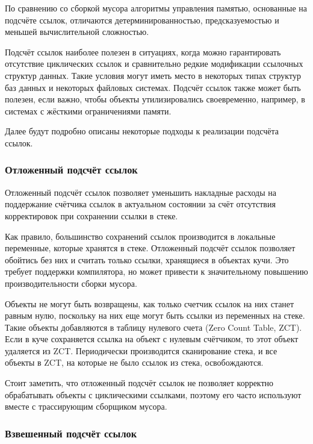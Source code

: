 По сравнению со сборкой мусора алгоритмы управления памятью, основанные на подсчёте ссылок, отличаются детерминированностью, предсказуемостью и меньшей вычислительной сложностью. \cite{cornell2} %

Подсчёт ссылок наиболее полезен в ситуациях, когда можно гарантировать отсутствие циклических ссылок и сравнительно редкие модификации ссылочных структур данных. Такие условия могут иметь место в некоторых типах структур баз данных и некоторых файловых системах. Подсчёт ссылок также может быть полезен, если важно, чтобы объекты утилизировались своевременно, например, в системах с жёсткими ограничениями памяти. \cite{recycling}

Далее будут подробно описаны некоторые подходы к реализации подсчёта ссылок. \cite{recycling}



\subsubsection{Отложенный подсчёт ссылок}

Отложенный подсчёт ссылок позволяет уменьшить накладные расходы на поддержание счётчика ссылок в актуальном состоянии за счёт отсутствия корректировок при сохранении ссылки в стеке. \cite{glossary}

Как правило, большинство сохранений ссылок производится в локальные переменные, которые хранятся в стеке. Отложенный подсчёт ссылок позволяет обойтись без них и считать только ссылки, хранящиеся в объектах кучи. Это требует поддержки компилятора, но может привести к значительному повышению производительности сборки мусора. \cite{glossary}

Объекты не могут быть возвращены, как только счетчик ссылок на них станет равным нулю, поскольку на них еще могут быть ссылки из переменных на стеке. Такие объекты добавляются в таблицу нулевого счета (Zero Count Table, ZCT). Если в куче сохраняется ссылка на объект с нулевым счётчиком, то этот объект удаляется из ZCT. Периодически производится сканирование стека, и все объекты в ZCT, на которые не было ссылок из стека, освобождаются. \cite{glossary}

Стоит заметить, что отложенный подсчёт ссылок не позволяет корректно обрабатывать объекты с циклическими ссылками, поэтому его часто используют вместе с трассирующим сборщиком мусора. \cite{recycling}

\subsubsection{Взвешенный подсчёт ссылок}

